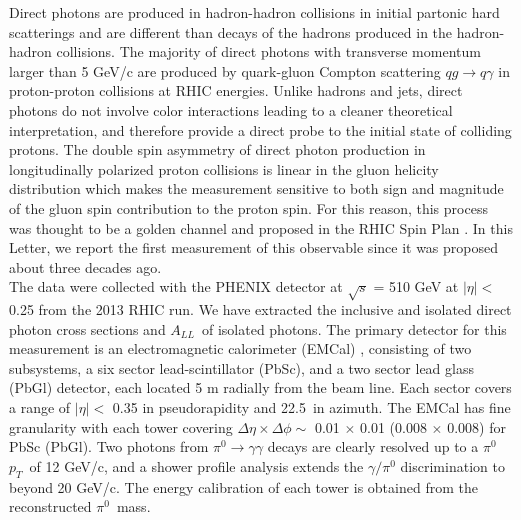 \documentclass[twocolumn,letterpaper,aps,prl,longbibliography,superscriptaddress,floatfix]{revtex4-2}
\newcommand{\pT}{\ensuremath{p_T}}
\newcommand{\pizero}{\ensuremath{\pi^0}}
\newcommand{\ALL}{\ensuremath{A_{LL}}}
\begin{document}
Direct photons are produced in hadron-hadron collisions in initial partonic hard scatterings and are different than decays of the hadrons produced in the hadron-hadron collisions. The majority of direct photons with transverse momentum larger than 5 GeV/c are produced by quark-gluon Compton scattering $qg \rightarrow q\gamma$ in proton-proton collisions at RHIC energies. Unlike hadrons and jets, direct photons do not involve color interactions leading to a cleaner theoretical interpretation, and therefore provide a direct probe to the initial state of colliding protons. The double spin asymmetry of direct photon production in longitudinally polarized proton collisions is linear in the gluon helicity distribution which makes the measurement sensitive to both sign and magnitude of the gluon spin contribution to the proton spin. For this reason, this process was thought to be a golden channel and proposed in the RHIC Spin Plan \cite{Bunce:2000uv}. In this Letter, we report the first measurement of this observable since it was proposed about three decades ago.\\
The data were collected with the PHENIX detector \cite{ADCOX2003469} at $\sqrt{s}$ = 510 GeV at $|\eta| <$ 0.25 from the 2013 RHIC run. We have extracted the inclusive and isolated direct photon cross sections and \ALL\ of isolated photons. The primary detector for this measurement is an electromagnetic calorimeter (EMCal) \cite{APHECETCHE2003521}, consisting of two subsystems, a six sector lead-scintillator (PbSc), and a two sector lead glass (PbGl) detector, each located 5 m radially from the beam line. Each sector covers a range of  $|\eta| <$ 0.35 in pseudorapidity and 22.5\textdegree\ in azimuth. The EMCal has fine granularity with each tower covering $\Delta\eta \times \Delta\phi \sim$ 0.01 $\times$ 0.01 (0.008 $\times$ 0.008) for PbSc (PbGl). Two photons from $\pi^0 \rightarrow \gamma\gamma$ decays are clearly resolved up to a \pizero\ \pT\ of 12 GeV/c, and a shower profile analysis extends the $\gamma/\pi^0$ discrimination to beyond 20 GeV/c. The energy calibration of each tower is obtained from the reconstructed \pizero\ mass.
\end{document}
